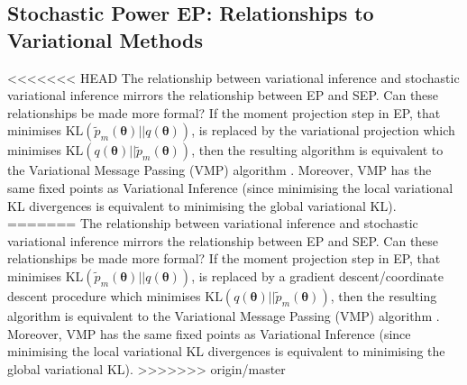 \subsection{Stochastic Power EP: Relationships to Variational Methods}
%
<<<<<<< HEAD
The relationship between variational inference and stochastic variational inference \cite{hoffman:svi} mirrors the relationship between EP and SEP. Can these relationships be made more formal? If the moment projection step in EP, that minimises $\mathrm{KL}(\tilde{p}_m(\bm{\theta}) ||q(\bm{\theta}))$, is replaced by the variational projection
which minimises $\mathrm{KL}(q(\bm{\theta})||\tilde{p}_m(\bm{\theta}) )$,  then the resulting algorithm is equivalent to the Variational Message Passing (VMP) algorithm \cite{minka:divergence}. Moreover, VMP has the same fixed points as Variational Inference \cite{winn:vmp} (since minimising the local variational KL divergences is equivalent to minimising the global variational KL).
=======
The relationship between variational inference and stochastic variational inference \cite{hoffman:svi} mirrors the relationship between EP and SEP. Can these relationships be made more formal? If the moment projection step in EP, that minimises $\mathrm{KL}(\tilde{p}_m(\bm{\theta}) ||q(\bm{\theta}))$, is replaced 
by a gradient descent/coordinate descent procedure
%
%
 which minimises $\mathrm{KL}(q(\bm{\theta})||\tilde{p}_m(\bm{\theta}) )$,  then the resulting algorithm is equivalent to the Variational Message Passing (VMP) algorithm \cite{minka:divergence}. Moreover, VMP has the same fixed points as Variational Inference \cite{winn:vmp} (since minimising the local variational KL divergences is equivalent to minimising the global variational KL).
>>>>>>> origin/master


